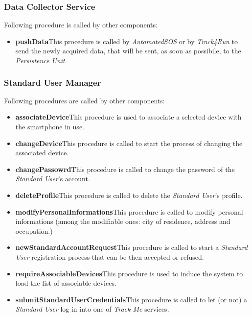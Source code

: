 \subsubsection{Data Collector Service}
Following procedure is called by other components:
\begin{itemize}
  \item \textbf{pushData}\quad This procedure is called by \textit{AutomatedSOS} or by \textit{Track4Run} to send the newly acquired data, that will be sent, as soon as possibile, to the \textit{Persistence Unit}.
\end{itemize}

\subsubsection{Standard User Manager}
Following procedures are called by other components:
\begin{itemize}
  \item \textbf{associateDevice}\quad This procedure is used to associate a selected device with the smartphone in use.
  \item \textbf{changeDevice}\quad This procedure is called to start the process of changing the associated device.
  \item \textbf{changePassowrd}\quad This procedure is called to change the password of the \textit{Standard User}'s account.
  \item \textbf{deleteProfile}\quad This procedure is called to delete the \textit{Standard User}'s profile.
  \item \textbf{modifyPersonalInformations}\quad This procedure is called to modify personal informations (among the modifiable ones:  city of residence, address and occupation.)
  \item \textbf{newStandardAccountRequest}\quad This procedure is called to start a \textit{Standard User} registration process that can be then accepted or refused.
  \item \textbf{requireAssociableDevices}\quad This procedure is used to induce the system to load the list of associable devices.
  \item \textbf{submitStandardUserCredentials}\quad This procedure is called to let (or not) a \textit{Standard User} log in into one of \textit{Track Me} services.
\end{itemize}

